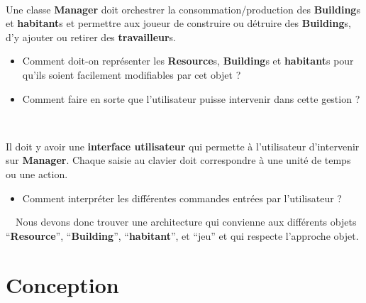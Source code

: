 \documentclass{article}
\begin{document}
\ \
\par Une classe \textbf{Manager} doit orchestrer la consommation/production des \textbf{Building}s et \textbf{habitant}s et permettre aux joueur de construire ou détruire des \textbf{Building}s, d'y ajouter ou retirer des \textbf{travailleur}s.
\begin{itemize}
    \item Comment doit-on représenter les \textbf{Resource}s, \textbf{Building}s et \textbf{habitant}s pour qu’ils soient facilement modifiables par cet objet ? 
    \item Comment faire en sorte que l’utilisateur puisse intervenir dans cette gestion ?
\end{itemize}
\ \
\par Il doit y avoir une \textbf{interface utilisateur} qui permette à l'utilisateur d’intervenir sur \textbf{Manager}. Chaque saisie au clavier doit correspondre à une unité de temps ou une action. 
\begin{itemize}
    \item Comment interpréter les différentes commandes entrées par l’utilisateur ?
\end{itemize}
\ \
Nous devons donc trouver une architecture qui convienne aux différents objets “\textbf{Resource}”, “\textbf{Building}”, “\textbf{habitant}”, et “jeu” et qui respecte l’approche objet.

\section*{Conception}
\end{document}
